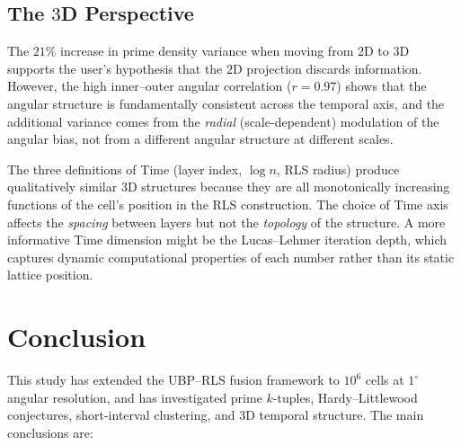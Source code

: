 \documentclass[11pt,a4paper]{article}
\theoremstyle{definition}
\begin{document}
\subsection{The $3$D Perspective}

The $21\%$ increase in prime density variance when moving from $2$D to $3$D
supports the user's hypothesis that the $2$D projection discards information.
However, the high inner--outer angular correlation ($r = 0.97$) shows that the
angular structure is fundamentally consistent across the temporal axis, and the
additional variance comes from the \emph{radial} (scale-dependent) modulation
of the angular bias, not from a different angular structure at different
scales.

The three definitions of Time (layer index, $\log n$, RLS radius) produce
qualitatively similar $3$D structures because they are all monotonically
increasing functions of the cell's position in the RLS construction.  The
choice of Time axis affects the \emph{spacing} between layers but not the
\emph{topology} of the structure.  A more informative Time dimension might
be the Lucas--Lehmer iteration depth, which captures dynamic computational
properties of each number rather than its static lattice position.

\section{Conclusion}
\label{sec:conclusion}

This study has extended the UBP--RLS fusion framework to $10^6$ cells at
$1^{\circ}$ angular resolution, and has investigated prime $k$-tuples,
Hardy--Littlewood conjectures, short-interval clustering, and $3$D temporal
structure.  The main conclusions are:
\end{document}
